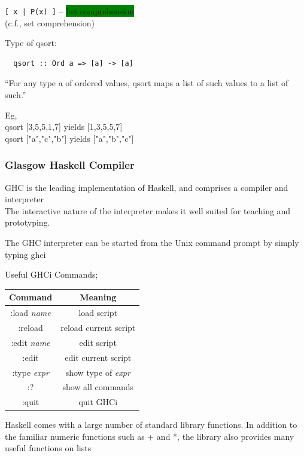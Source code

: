 \documentclass[tikz,border=10pt]{project_plan}
\begin{document}
\lstinline{[ x | P(x) ]} – \colorbox{green}{list comprehension}\\
(c.f., set comprehension)

Type of qsort:
\begin{lstlisting}
  qsort :: Ord a => [a] -> [a]
\end{lstlisting}
“For any type a of ordered values, qsort maps a list
of such values to a list of such.”

Eg,\\
qsort [3,5,5,1,7] yields [1,3,5,5,7]\\
qsort ["a","c","b"] yields ["a","b","c"]

\subsubsection{Glasgow Haskell Compiler}

GHC is the leading implementation of Haskell, and
comprises a compiler and interpreter\\
The interactive nature of the interpreter makes it
well suited for teaching and prototyping.

The GHC interpreter can be started from the Unix
command prompt by simply typing ghci

Useful GHCi Commands;\\
\begin{tabular}{||c c||}
  \hline
  Command             & Meaning                    \\ [0.5ex]
  \hline\hline
  :load \textit{name} & load script                \\
  \hline
  :reload             & reload current script      \\
  \hline
  :edit \textit{name} & edit script                \\
  \hline
  :edit               & edit current script        \\
  \hline
  :type \textit{expr} & show type of \textit{expr} \\
  \hline
  :?                  & show all commands          \\
  \hline
  :quit               & quit GHCi                  \\ [1ex]
  \hline
\end{tabular}

Haskell comes with a large number of standard library
functions. In addition to the familiar numeric functions
such as + and *, the library also provides many useful
functions on lists
\end{document}
